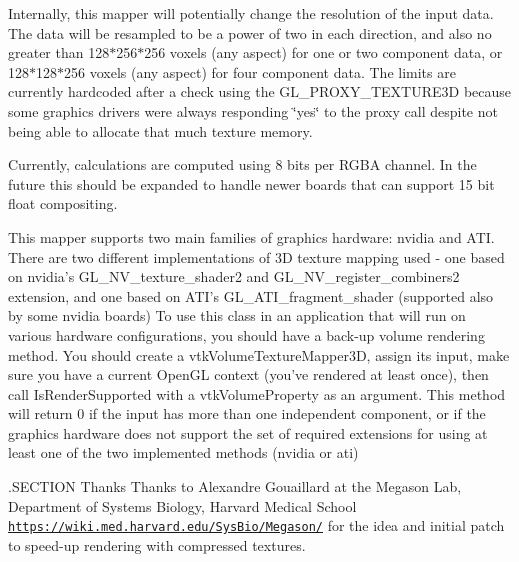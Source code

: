 Internally, this mapper will potentially change the resolution of the input data. The data will be resampled to be a power of two in each direction, and also no greater than 128$\ast$256$\ast$256 voxels (any aspect) for one or two component data, or 128$\ast$128$\ast$256 voxels (any aspect) for four component data. The limits are currently hardcoded after a check using the G\-L\-\_\-\-P\-R\-O\-X\-Y\-\_\-\-T\-E\-X\-T\-U\-R\-E3\-D because some graphics drivers were always responding \char`\"{}yes\char`\"{} to the proxy call despite not being able to allocate that much texture memory.

Currently, calculations are computed using 8 bits per R\-G\-B\-A channel. In the future this should be expanded to handle newer boards that can support 15 bit float compositing.

This mapper supports two main families of graphics hardware\-: nvidia and A\-T\-I. There are two different implementations of 3\-D texture mapping used -\/ one based on nvidia's G\-L\-\_\-\-N\-V\-\_\-texture\-\_\-shader2 and G\-L\-\_\-\-N\-V\-\_\-register\-\_\-combiners2 extension, and one based on A\-T\-I's G\-L\-\_\-\-A\-T\-I\-\_\-fragment\-\_\-shader (supported also by some nvidia boards) To use this class in an application that will run on various hardware configurations, you should have a back-\/up volume rendering method. You should create a vtk\-Volume\-Texture\-Mapper3\-D, assign its input, make sure you have a current Open\-G\-L context (you've rendered at least once), then call Is\-Render\-Supported with a vtk\-Volume\-Property as an argument. This method will return 0 if the input has more than one independent component, or if the graphics hardware does not support the set of required extensions for using at least one of the two implemented methods (nvidia or ati)

.S\-E\-C\-T\-I\-O\-N Thanks Thanks to Alexandre Gouaillard at the Megason Lab, Department of Systems Biology, Harvard Medical School \href{https://wiki.med.harvard.edu/SysBio/Megason/}{\tt https\-://wiki.\-med.\-harvard.\-edu/\-Sys\-Bio/\-Megason/} for the idea and initial patch to speed-\/up rendering with compressed textures.

